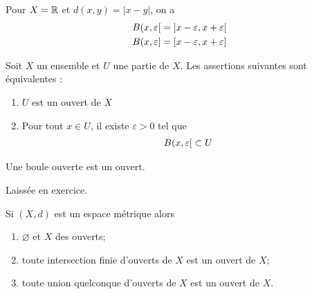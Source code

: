 \documentclass[french,a4paper,10pt]{article}
\begin{document}
	\begin{example}
		Pour $X=\mathbb{R}$ et $d(x,y)=|x-y|$, on a
		\[\begin{aligned}
			B(x,\varepsilon\mathopen{}[\mathclose{}=\mathopen{]}x-\varepsilon, x+\varepsilon\mathclose{[}\\
			B(x,\varepsilon\mathopen{}]\mathclose{}=\mathopen{[}x-\varepsilon, x+\varepsilon\mathclose{]}
		\end{aligned}\]
	\end{example}
	
	\begin{definition}
		Soit $X$ un ensemble et $U$ une partie de $X$. Les assertions suivantes sont équivalentes :
		\begin{enumerate}[label=$(\roman*)$]
			\item $U$ est un ouvert de $X$
			\item Pour tout $x\in U$, il existe $\varepsilon>0$ tel que
			\[\begin{aligned}
				B({x,\varepsilon}\mathopen{}[\mathclose{}\subset U
			\end{aligned}\]
		\end{enumerate}
	\end{definition}
	
	
	\begin{example}
		Une boule ouverte est un ouvert.
	\end{example}
	\begin{myproof}
		Laissée en exercice.
	\end{myproof}
	
	\begin{remark}
		Si $(X,d)$ est un espace métrique alors
		\begin{enumerate}
			\item $\varnothing$ et $X$ des ouverts;
			\item toute intersection finie d'ouverts de $X$ est un ouvert de $X$;
			\item toute union quelconque d'ouverts de $X$ est un ouvert de $X$.
		\end{enumerate}
	\end{remark}
	
\end{document}
